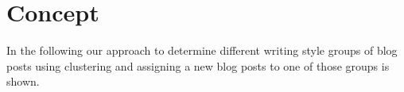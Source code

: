 
\section{Concept}
\label{sec:concept}
In the following our approach to determine different writing style groups of blog posts using clustering and assigning a new blog posts to one of those groups is shown.



